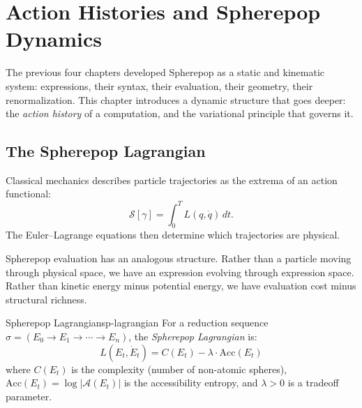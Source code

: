 
\chapter{Action Histories and Spherepop Dynamics}



The previous four chapters developed Spherepop as a static and kinematic
system: expressions, their syntax, their evaluation, their geometry, their
renormalization. This chapter introduces a dynamic structure that goes deeper:
the \emph{action history} of a computation, and the variational principle
that governs it.

\section{The Spherepop Lagrangian}

Classical mechanics describes particle trajectories as the extrema of
an action functional:
\[
  \mathcal{S}[\gamma] = \int_0^T L(q, \dot{q})\,dt.
\]
The Euler–Lagrange equations then determine which trajectories are physical.

Spherepop evaluation has an analogous structure. Rather than a particle
moving through physical space, we have an expression evolving through
expression space. Rather than kinetic energy minus potential energy,
we have evaluation cost minus structural richness.

\begin{definition}{Spherepop Lagrangian}{sp-lagrangian}
  For a reduction sequence $\sigma = (E_0 \to E_1 \to \cdots \to E_n)$,
  the \emph{Spherepop Lagrangian} is:
  \[
    L(E_t, \dot{E}_t) = C(E_t) - \lambda \cdot \mathrm{Acc}(E_t)
  \]
  where $C(E_t)$ is the complexity (number of non-atomic spheres),
  $\mathrm{Acc}(E_t) = \log |\mathcal{A}(E_t)|$ is the accessibility
  entropy, and $\lambda > 0$ is a tradeoff parameter.
\end{definition}

